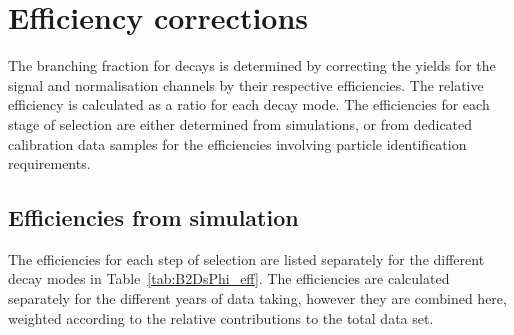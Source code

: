 \section{Efficiency corrections}
\label{sec:B2DsPhi_effcorrections}

The branching fraction for \decay{\Bp}{\Dsp\phiz} decays is determined by correcting the yields for the signal and normalisation channels by their respective efficiencies. 
The relative efficiency is calculated as a ratio for each \Dsp decay mode.    
The efficiencies for each stage of selection are either determined from simulations, or from dedicated calibration data samples for the efficiencies involving particle identification requirements. 


\subsection{Efficiencies from simulation}

The efficiencies for each step of selection are listed separately for the different \Dsp decay modes in Table~\ref{tab:B2DsPhi_eff}. 
The efficiencies are calculated separately for the different years of data taking, however they are combined here, weighted according to the relative contributions to the total data set. 


